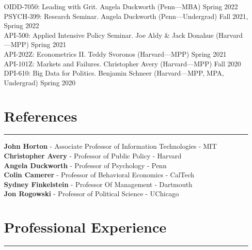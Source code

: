 \documentclass[11.25pt]{article}
\begin{document}
\vspace{1mm}OIDD-7050: Leading with Grit. Angela Duckworth (Penn---MBA) \hfill Spring 2022\\
\vspace{1mm}PSYCH-399: Research Seminar. Angela Duckworth (Penn---Undergrad) \hfill Fall 2021, Spring 2022\\
\vspace{1mm}API-500: Applied Intensive Policy Seminar. Joe Aldy \& Jack Donahue (Harvard---MPP)  \hfill Spring 2021\\
%
\vspace{1mm}API-202Z: Econometrics II. Teddy Svoronos (Harvard---MPP)  \hfill Spring 2021\\
%
\vspace{1mm}API-101Z: Markets and Failures. Christopher Avery (Harvard---MPP) \hfill Fall 2020\\
%
\vspace{1mm}DPI-610: Big Data for Politics. Benjamin Schneer (Harvard---MPP, MPA, Undergrad) \hfill Spring 2020\\


\vspace{-.65cm}

\section*{References}  \vspace{-1mm} \hrule
\vspace{3mm}
\textbf{John Horton} - Associate Professor of Information Technologies - MIT\\
\textbf{Christopher Avery} - Professor of Public Policy - Harvard\\
\textbf{Angela Duckworth} - Professor of Psychology - Penn\\
\textbf{Colin Camerer} - Professor of Behavioral Economics - CalTech\\
\textbf{ Sydney Finkelstein} - Professor Of Management - Dartmouth \\
\textbf{Jon Rogowski} - Professor of Political Science - UChicago\\

\vspace{-.45cm}

\section*{Professional Experience}  \vspace{-1mm} \hrule
\vspace{3mm}
\end{document}
